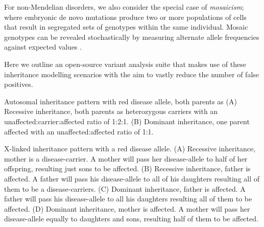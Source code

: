 For non-Mendelian disorders, we also consider the special case of \textit{mosaicism}; where embryonic de novo mutations produce two or more populations of cells that result in segregated sets of genotypes within the same individual. Mosaic genotypes can be revealed stochastically by measuring alternate allele frequencies against expected values \citep{biesecker2013genomic}.

Here we outline an open-source variant analysis suite that makes use of these inheritance modelling scenarios with the aim to vastly reduce the number of false positives.


	{Autosomal inheritance pattern with red disease allele, both parents as 
(A) Recessive inheritance, both parents as heterozygous carriers with an unaffected:carrier:affected ratio of 1:2:1.
(B) Dominant inheritance, one parent affected with an unaffected:affected ratio of 1:1.}
	
	{X-linked inheritance pattern with a red disease allele.
(A) Recessive inheritance, mother is a disease-carrier. A mother will pass her disease-allele
to half of her offspring, resulting just sons to be affected.
(B) Recessive inheritance, father is affected. A father will pass his disease-allele to all of
his daughters resulting all of them to be a disease-carriers.
(C) Dominant inheritance, father is affected. A father will pass his disease-allele to all his
daughters resulting all of them to be affected. 
(D) Dominant inheritance, mother is affected. A mother will pass her disease-allele
equally to daughters and sons, resulting half of them to be affected.}

